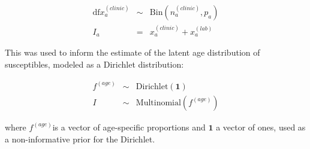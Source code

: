 \begin{eqnarray}
\text{df}x_a^{(clinic)} &\sim& \text{Bin}(n_a^{(clinic)},p_a) \\
I_a &=& x_a^{(clinic)}+x_a^{(lab)}
\end{eqnarray}

This was used to inform the estimate of the latent age distribution of susceptibles, modeled as a Dirichlet distribution:

\begin{eqnarray}
f^{(age)} &\sim& \text{Dirichlet}(\mathbf{1}) \\
I &\sim& \text{Multinomial}(f^{(age)})
\end{eqnarray}

where \(f^{(age)}\)is a vector of age-specific proportions and \(\mathbf{1}\) a vector of ones, used as a non-informative prior for the Dirichlet.